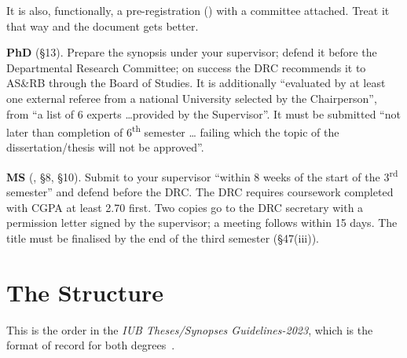 It is also, functionally, a pre-registration () with a committee
attached. Treat it that way and the document gets better.

\begin{regbox}
\textbf{PhD} (\S13). Prepare the synopsis under your supervisor; defend it
before the Departmental Research Committee; on success the DRC recommends it to
AS\&RB through the Board of Studies. It is additionally ``evaluated by at least
one external referee from a national University selected by the Chairperson'',
from ``a list of 6 experts \ldots provided by the Supervisor''. It must be
submitted ``not later than completion of 6\textsuperscript{th} semester \ldots
failing which the topic of the dissertation/thesis will not be approved''.

\medskip
\textbf{MS} (\cite{iub2024mphil}, \S8, \S10). Submit to your supervisor
``within 8 weeks of the start of the 3\textsuperscript{rd} semester'' and defend
before the DRC. The DRC requires coursework completed with CGPA at least
2.70 first. Two copies go to the DRC secretary with a permission letter signed
by the supervisor; a meeting follows within 15 days. The title must be
finalised by the end of the third semester (\S47(iii)).
\end{regbox}

\section{The Structure}

This is the order in the \emph{IUB Theses/Synopses Guidelines-2023}, which is
the format of record for both degrees~\cite{iub2023theses}.

